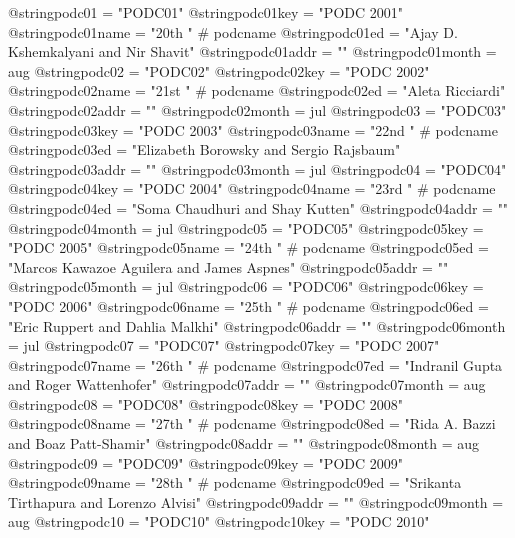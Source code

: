 @string{podc01 =                "PODC01"}
@string{podc01key =             "PODC 2001"}
@string{podc01name =            "20th " # podcname}
@string{podc01ed =              "Ajay D. Kshemkalyani and Nir Shavit"}
@string{podc01addr =            ""}
@string{podc01month =           aug}
@string{podc02 =                "PODC02"}
@string{podc02key =             "PODC 2002"}
@string{podc02name =            "21st " # podcname}
@string{podc02ed =              "Aleta Ricciardi"}
@string{podc02addr =            ""}
@string{podc02month =           jul}
@string{podc03 =                "PODC03"}
@string{podc03key =             "PODC 2003"}
@string{podc03name =            "22nd " # podcname}
@string{podc03ed =              "Elizabeth Borowsky and Sergio Rajsbaum"}
@string{podc03addr =            ""}
@string{podc03month =           jul}
@string{podc04 =                "PODC04"}
@string{podc04key =             "PODC 2004"}
@string{podc04name =            "23rd " # podcname}
@string{podc04ed =              "Soma Chaudhuri and Shay Kutten"}
@string{podc04addr =            ""}
@string{podc04month =           jul}
@string{podc05 =                "PODC05"}
@string{podc05key =             "PODC 2005"}
@string{podc05name =            "24th " # podcname}
@string{podc05ed =              "Marcos Kawazoe Aguilera and James Aspnes"}
@string{podc05addr =            ""}
@string{podc05month =           jul}
@string{podc06 =                "PODC06"}
@string{podc06key =             "PODC 2006"}
@string{podc06name =            "25th " # podcname}
@string{podc06ed =              "Eric Ruppert and Dahlia Malkhi"}
@string{podc06addr =            ""}
@string{podc06month =           jul}
@string{podc07 =                "PODC07"}
@string{podc07key =             "PODC 2007"}
@string{podc07name =            "26th " # podcname}
@string{podc07ed =              "Indranil Gupta and Roger Wattenhofer"}
@string{podc07addr =            ""}
@string{podc07month =           aug}
@string{podc08 =                "PODC08"}
@string{podc08key =             "PODC 2008"}
@string{podc08name =            "27th " # podcname}
@string{podc08ed =              "Rida A. Bazzi and Boaz Patt-Shamir"}
@string{podc08addr =            ""}
@string{podc08month =           aug}
@string{podc09 =                "PODC09"}
@string{podc09key =             "PODC 2009"}
@string{podc09name =            "28th " # podcname}
@string{podc09ed =              "Srikanta Tirthapura and Lorenzo Alvisi"}
@string{podc09addr =            ""}
@string{podc09month =           aug}
@string{podc10 =                "PODC10"}
@string{podc10key =             "PODC 2010"}
